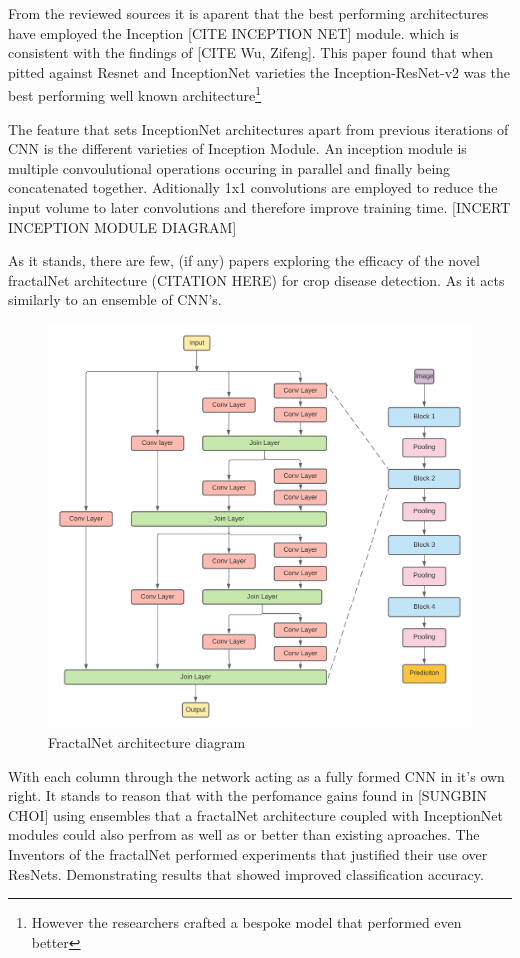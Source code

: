   \par
  From the reviewed sources it is aparent that the best performing architectures have employed the Inception [CITE INCEPTION NET] module.
  which is consistent with the findings of [CITE Wu, Zifeng]. This paper found that when pitted against Resnet and InceptionNet varieties the Inception-ResNet-v2 was the best performing well known architecture\footnote[3]{However the researchers crafted a bespoke model that performed even better}
  \par
  The feature that sets InceptionNet architectures apart from previous iterations of CNN is the different varieties of Inception Module. An inception module is multiple convoulutional operations occuring in parallel and finally being concatenated together. Aditionally 1x1 convolutions are employed to reduce the input volume to later convolutions and therefore improve training time. [INCERT INCEPTION MODULE DIAGRAM]
  \par
  As it stands, there are few, (if any) papers exploring the efficacy of the novel fractalNet architecture (CITATION HERE) for crop disease detection. As it acts similarly to an ensemble of CNN's.
  \par
  \begin{figure}[H]
    \begin{center}
      \includegraphics[scale=0.7]{Images/FractalNetArchitectureCopy}
      \caption{FractalNet architecture diagram}
      \label{fig:fractalNet_diagram}
    \end{center}
  \end{figure}
  \par
  With each column through the network acting as a fully formed CNN in it's own right. It stands to reason that with the perfomance gains found in [SUNGBIN CHOI] using ensembles that a fractalNet architecture coupled with InceptionNet modules could also perfrom as well as or better than existing aproaches. The Inventors of the fractalNet performed experiments that justified their use over ResNets. Demonstrating results that showed improved classification accuracy.



